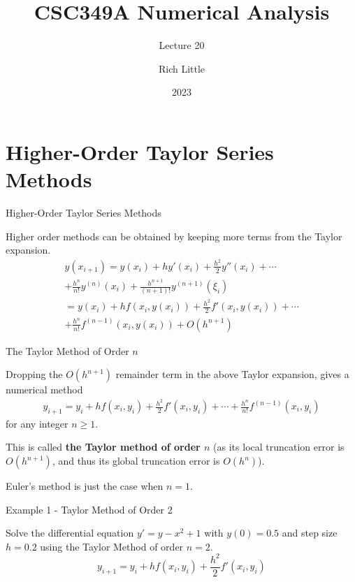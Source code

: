 \documentclass[12pt]{beamer}
\title[CSC349A Numerical Analysis]{CSC349A Numerical Analysis}
\subtitle[Lecture 20]{Lecture 20}
\date[2023]{2023}
\author[R. Little]{Rich Little}
\institute[University of Victoria]{University of Victoria}
\begin{document}
\frame{\maketitle} %



\section{Higher-Order Taylor Series Methods}

\begin{frame}{Higher-Order Taylor Series Methods}

Higher order methods can be obtained by keeping more terms from the Taylor expansion.
\begin{multline*}
y(x_{i+1})=y(x_i)+hy'(x_i)+\frac{h^2}{2}y''(x_i)+\dotsm \\
	+\frac{h^n}{n!}y^{(n)}(x_i)+\frac{h^{n+1}}{(n+1)!}y^{(n+1)}(\xi_i) \\
=y(x_i)+hf(x_i,y(x_i))+\frac{h^2}{2}f'(x_i,y(x_i))+\dotsm \\
	+\frac{h^n}{n!}f^{(n-1)}(x_i,y(x_i))+O(h^{n+1})
\end{multline*}

\end{frame}

\begin{frame}{The Taylor Method of Order $n$}

Dropping the $O(h^{n+1})$ remainder term in the above Taylor expansion, gives a numerical method
\begin{multline*}
y_{i+1}=y_i+hf(x_i,y_i)+\frac{h^2}{2}f'(x_i,y_i)+\dotsm 
	+\frac{h^n}{n!}f^{(n-1)}(x_i,y_i)
\end{multline*}
for any integer $n \geq 1$.

This is called {\bf the Taylor method of order $n$} (as its local truncation error is $O(h^{n+1})$, and thus its global truncation error is $O(h^n)$).

Euler’s method is just the case when $n=1$.
\end{frame}

\begin{frame}{Example 1 - Taylor Method of Order 2}

Solve the differential equation $y'=y-x^2+1$ with $y(0)=0.5$ and step size $h=0.2$ using the Taylor Method of order $n=2$.
\[
y_{i+1}=y_i + hf(x_i,y_i) + \frac{h^2}{2}f'(x_i,y_i)
\]
\vspace{3 in}
\end{frame}
\end{document}
